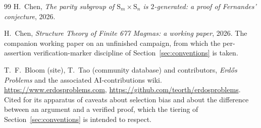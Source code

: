 \begin{thebibliography}{99}
H.~Chen,
\emph{The parity subgroup of $\mathrm{S}_m \times \mathrm{S}_n$ is $2$-generated: a proof of
Fernandes' conjecture}, 2026.

H.~Chen,
\emph{Structure Theory of Finite 677 Magmas: a working paper}, 2026.
The companion working paper on an unfinished campaign, from which the per-assertion
verification-marker discipline of Section~\ref{sec:conventions} is taken.

T.~F.~Bloom (site), T.~Tao (community database) and contributors,
\emph{Erd\H{o}s Problems} and the associated AI-contributions wiki.
\url{https://www.erdosproblems.com}, \url{https://github.com/teorth/erdosproblems}.
Cited for its apparatus of caveats about selection bias and about the difference between an
argument and a verified proof, which the tiering of Section~\ref{sec:conventions} is
intended to respect.

\end{thebibliography}
